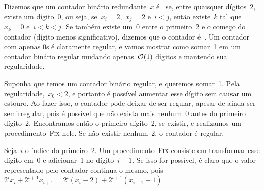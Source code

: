 \documentclass[main.tex]{subfiles}
\begin{document}
Dizemos que um contador binário redundante~$x$ é~ se, entre quaisquer dígitos~2, existe um dígito~0, ou seja, se~${x_i = 2}$,~${x_j = 2}$ e~$i < j$, então existe~$k$ tal que~${x_k = 0}$ e~${i < k < j}$. Se também existe um~0 entre o primeiro~2 e o começo do contador (dígito menos significativo), dizemos que o contador é~. Um contador com apenas 0s é claramente regular, e vamos mostrar como somar~1 em um contador binário regular mudando apenas~$\mathcal{O}(1)$ dígitos e mantendo sua regularidade.

Suponha que temos um contador binário regular, e queremos somar~1. Pela regularidade,~${x_0 < 2}$, e portanto é possível aumentar esse dígito sem causar um estouro. Ao fazer isso, o contador pode deixar de ser regular, apesar de ainda ser semirregular, pois é possível que não exista mais nenhum~0 antes do primeiro dígito~2. Encontramos então o primeiro dígito~2, se existir, e realizamos um procedimento~\textsc{Fix} nele. Se não existir nenhum~2, o contador é regular.

Seja~$i$ o índice do primeiro~2. Um procedimento~\textsc{Fix} consiste em transformar esse dígito em~0 e adicionar~1 no dígito~$i+1$. Se isso for possível, é claro que o valor representado pelo contador continua o mesmo, pois~$2^i x_i + 2^{i+1} x_{i+1} = 2^i (x_i - 2) + 2^{i+1} (x_{i+1} + 1)$.
\end{document}
